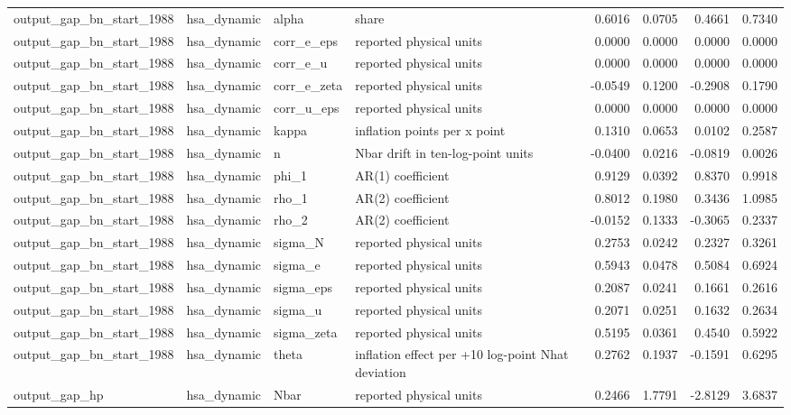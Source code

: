 \begin{tabular}{llllrrrr}
output\_gap\_bn\_start\_1988 & hsa\_dynamic & alpha & share & 0.6016 & 0.0705 & 0.4661 & 0.7340 \\
output\_gap\_bn\_start\_1988 & hsa\_dynamic & corr\_e\_eps & reported physical units & 0.0000 & 0.0000 & 0.0000 & 0.0000 \\
output\_gap\_bn\_start\_1988 & hsa\_dynamic & corr\_e\_u & reported physical units & 0.0000 & 0.0000 & 0.0000 & 0.0000 \\
output\_gap\_bn\_start\_1988 & hsa\_dynamic & corr\_e\_zeta & reported physical units & -0.0549 & 0.1200 & -0.2908 & 0.1790 \\
output\_gap\_bn\_start\_1988 & hsa\_dynamic & corr\_u\_eps & reported physical units & 0.0000 & 0.0000 & 0.0000 & 0.0000 \\
output\_gap\_bn\_start\_1988 & hsa\_dynamic & kappa & inflation points per x point & 0.1310 & 0.0653 & 0.0102 & 0.2587 \\
output\_gap\_bn\_start\_1988 & hsa\_dynamic & n & Nbar drift in ten-log-point units & -0.0400 & 0.0216 & -0.0819 & 0.0026 \\
output\_gap\_bn\_start\_1988 & hsa\_dynamic & phi\_1 & AR(1) coefficient & 0.9129 & 0.0392 & 0.8370 & 0.9918 \\
output\_gap\_bn\_start\_1988 & hsa\_dynamic & rho\_1 & AR(2) coefficient & 0.8012 & 0.1980 & 0.3436 & 1.0985 \\
output\_gap\_bn\_start\_1988 & hsa\_dynamic & rho\_2 & AR(2) coefficient & -0.0152 & 0.1333 & -0.3065 & 0.2337 \\
output\_gap\_bn\_start\_1988 & hsa\_dynamic & sigma\_N & reported physical units & 0.2753 & 0.0242 & 0.2327 & 0.3261 \\
output\_gap\_bn\_start\_1988 & hsa\_dynamic & sigma\_e & reported physical units & 0.5943 & 0.0478 & 0.5084 & 0.6924 \\
output\_gap\_bn\_start\_1988 & hsa\_dynamic & sigma\_eps & reported physical units & 0.2087 & 0.0241 & 0.1661 & 0.2616 \\
output\_gap\_bn\_start\_1988 & hsa\_dynamic & sigma\_u & reported physical units & 0.2071 & 0.0251 & 0.1632 & 0.2634 \\
output\_gap\_bn\_start\_1988 & hsa\_dynamic & sigma\_zeta & reported physical units & 0.5195 & 0.0361 & 0.4540 & 0.5922 \\
output\_gap\_bn\_start\_1988 & hsa\_dynamic & theta & inflation effect per +10 log-point Nhat deviation & 0.2762 & 0.1937 & -0.1591 & 0.6295 \\
output\_gap\_hp & hsa\_dynamic & Nbar & reported physical units & 0.2466 & 1.7791 & -2.8129 & 3.6837 \\

\end{tabular}
